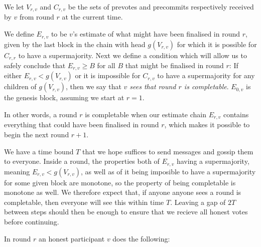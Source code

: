 \documentclass{article}
\begin{document}
We let $V_{r,v}$ and $C_{r,v}$ be the sets of prevotes and precommits respectively received by $v$ from round $r$ at the current time.

We define $E_{r,v}$ to be $v$'s estimate of what might have been finalised in round $r$, given by the last block in the chain with head $g(V_{r,v})$ for which it is possible for $C_{r,r}$ to have a supermajority. Next we define a condition which will allow us to safely conclude that $E_{r,v} \geq B$ for all $B$ that might be finalised in round $r$:
If either $E_{r,v} < g(V_{r,v})$ or it is impossible for $C_{r,v}$ to have a supermajority for any children of $g(V_{r,v})$, then we say that {\em $v$ sees that round $r$ is completable}.  $E_{0,v}$ is the genesis block, assuming we start at $r=1$.  

In other words, a round $r$ is completable when our estimate chain $E_{r,v}$ contains everything that could have been finalised in round $r$, which makes it possible to begin the next round $r+1$.

We have a time bound $T$ that we hope suffices to send messages and gossip them to everyone.
Inside a round, the properties both of $E_{r,v}$ having a supermajority, meaning $E_{r,v} < g(V_{r,v})$, as well as of it being imposible to have a supermajority for some given block are monotone, so the property of being completable is monotone as well.
We therefore expect that, if anyone anyone sees a round is completable, then everyone will see this within time $T$. Leaving a gap of $2T$ between steps should then be  enough to ensure that we recieve all honest votes before continuing.

In round $r$ an honest participant $v$ does the following:
\end{document}
